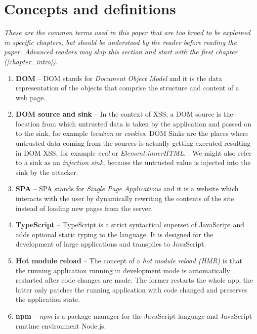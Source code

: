 \chapter*{Concepts and definitions} %
\label{definitions}

\textit{These are the common terms used in this paper that are too broad to be explained in specific
  chapters, but should be understood by the reader before reading the paper. Advanced readers may
  skip this section and start with the first chapter (\ref{chapter_intro}).}

\begin{enumerate}
  \item \label{def:dom} \textbf{DOM} -- DOM stands for \emph{Document Object Model} and it is
        the data representation of the objects that comprise the structure and content of a web
        page.
  \item \label{def:dom_source_sink} \textbf{DOM source and sink} -- In the context of XSS, a DOM
        source is the location from which untrusted data is taken by the application and passed on
        to the sink, for example \emph{location} or \emph{cookies}. DOM Sinks are the places where
        untrusted data coming from the sources is actually getting executed resulting in DOM XSS,
        for example \emph{eval} or \emph{Element.innerHTML}. \cite{source_sink_definition}. We might
        also refer to a sink as an \emph{injection sink}, because the untrusted value is injected
        into the sink by the attacker.
  \item \label{def:spa} \textbf{SPA} -- SPA stands for \emph{Single Page Applications} and it
        is a website which interacts with the user by dynamically rewriting the contents of the site
        instead of loading new pages from the server.
  \item \label{def:ts} \textbf{TypeScript} -- TypeScript is a strict syntactical superset of
        JavaScript and adds optional static typing to the language. It is designed for the
        development of large applications and transpiles to JavaScript.
  \item \label{def:hot_reload} \textbf{Hot module reload} -- The concept of a \emph{hot module
          reload (HMR)} is that the running application running in development mode is automatically
        restarted after code changes are made. The former restarts the whole app, the latter only
        patches the running application with code changed and preserves the application state.
  \item \label{def:npm} \textbf{npm} -- \emph{npm} is a package manager for the JavaScript
        language and JavaScript runtime environment Node.js.
\end{enumerate}
